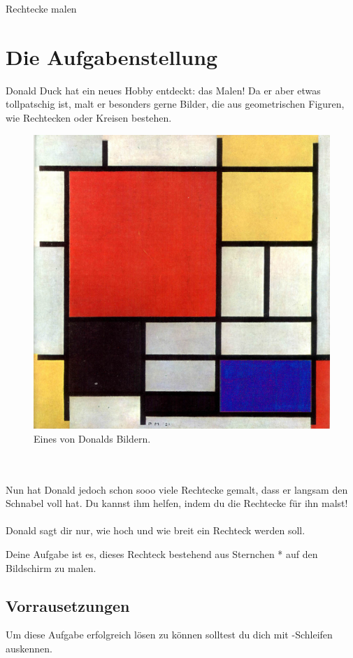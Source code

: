 \documentclass{\VorlagenPfad/coderdojokatext}
\newcommand{\Titel}{Rechtecke malen}
\begin{document}
	
	\begin{center}
		{\huge \Titel}
	\end{center}
	
	\section{Die Aufgabenstellung} Donald Duck hat ein neues Hobby entdeckt: das Malen! Da er aber etwas tollpatschig ist, malt er besonders gerne Bilder, die aus geometrischen Figuren, wie Rechtecken oder Kreisen bestehen.
	\\
	\begin{figure}[h]
	\caption{Eines von Donalds Bildern.}
	\includegraphics[scale=0.3]{Piet}
	\centering
	\end{figure}
	\\ \\
	Nun hat Donald jedoch schon sooo viele Rechtecke gemalt, dass er langsam den Schnabel voll hat. Du kannst ihm helfen, indem du die Rechtecke für ihn malst!
	\\
	\\
	Donald sagt dir nur, wie hoch und wie breit ein Rechteck werden soll.
	
	Deine Aufgabe ist es, dieses Rechteck bestehend aus Sternchen * auf den Bildschirm zu malen.
	
	\subsection{Vorrausetzungen} Um diese Aufgabe erfolgreich lösen zu können solltest du dich mit -Schleifen auskennen.
	
\end{document}
